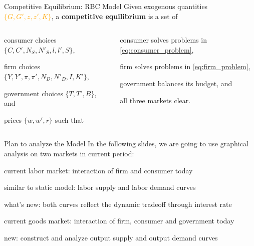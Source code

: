 \documentclass[11pt,aspectratio=169,usenames,dvipsnames]{beamer}
\newcommand{\orange}[1]{\textcolor{orange}{#1}}
\newcommand{\green}[1]{\textcolor{OliveGreen}{#1}}
\let\tempone\itemize
\let\temptwo\enditemize
\renewenvironment{itemize}{\tempone\addtolength{\itemsep}{\fill}}{\temptwo}
\let\tempa\enumerate
\let\tempb\endenumerate
\renewenvironment{enumerate}{\tempa\addtolength{\itemsep}{\fill}}{\tempb}
\begin{document}
\begin{frame}{Competitive Equilibrium: RBC Model}
\label{slide:Competitive_Equilibrium__RBC_Model}
Given exogenous quantities \orange{$\{ G, G', z, z', K \}$}, a \textbf{competitive equilibrium} is a set of
\begin{columns}
    \begin{column}{0.5\textwidth}
        \begin{enumerate}
            \item consumer choices \green{$\{ C, C', N_{S}, N'_{S}, l, l', S \}$},
            \item firm choices \green{ $ \{ Y, Y', \pi, \pi', N_{D}, N'_{D}, I, K' \} $},
            \item government choices \green{ $ \{ T, T', B \} $}, and
            \item prices \green{ $ \{ w, w', r \} $}
        \end{enumerate}
        such that
    \end{column}
    \begin{column}{0.5\textwidth}
        \begin{enumerate}
            \item consumer solves problems in \eqref{eq:consumer_problem},
            \item firm solves problems in \eqref{eq:firm_problem},
            \item government balances its budget, and
            \item all three markets clear.
        \end{enumerate}
    \end{column}
\end{columns}
\end{frame}

\begin{frame}{Plan to analyze the Model}
\label{slide:Plan_to_analyze_the_Model}
    In the following slides, we are going to use graphical analysis on \alert{two markets} in \alert{current period}:
    \begin{enumerate}
        \item \alert{current labor market}: interaction of firm and consumer today
        \begin{itemize}
            \item similar to static model: \alert{labor supply} and \alert{labor demand} curves
            \item what's new: both curves reflect the dynamic tradeoff through interest rate
        \end{itemize}
        \item \alert{current goods market}: interaction of firm, consumer and government today
        \begin{itemize}
            \item new: construct and analyze \alert{output supply} and \alert{output demand} curves
        \end{itemize}
    \end{enumerate}
\end{frame}
\end{document}
